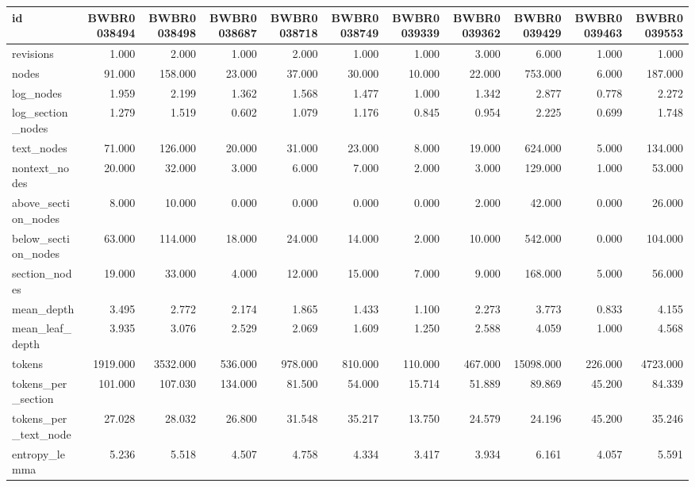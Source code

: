 \begin{tabular}{lrrrrrrrrrr}
\toprule
id & BWBR0038494 & BWBR0038498 & BWBR0038687 & BWBR0038718 & BWBR0038749 & BWBR0039339 & BWBR0039362 & BWBR0039429 & BWBR0039463 & BWBR0039553 \\
\midrule
revisions & 1.000 & 2.000 & 1.000 & 2.000 & 1.000 & 1.000 & 3.000 & 6.000 & 1.000 & 1.000 \\
\cline{1-11}
nodes & 91.000 & 158.000 & 23.000 & 37.000 & 30.000 & 10.000 & 22.000 & 753.000 & 6.000 & 187.000 \\
\cline{1-11}
log\_nodes & 1.959 & 2.199 & 1.362 & 1.568 & 1.477 & 1.000 & 1.342 & 2.877 & 0.778 & 2.272 \\
\cline{1-11}
log\_section\_nodes & 1.279 & 1.519 & 0.602 & 1.079 & 1.176 & 0.845 & 0.954 & 2.225 & 0.699 & 1.748 \\
\cline{1-11}
text\_nodes & 71.000 & 126.000 & 20.000 & 31.000 & 23.000 & 8.000 & 19.000 & 624.000 & 5.000 & 134.000 \\
\cline{1-11}
nontext\_nodes & 20.000 & 32.000 & 3.000 & 6.000 & 7.000 & 2.000 & 3.000 & 129.000 & 1.000 & 53.000 \\
\cline{1-11}
above\_section\_nodes & 8.000 & 10.000 & 0.000 & 0.000 & 0.000 & 0.000 & 2.000 & 42.000 & 0.000 & 26.000 \\
\cline{1-11}
below\_section\_nodes & 63.000 & 114.000 & 18.000 & 24.000 & 14.000 & 2.000 & 10.000 & 542.000 & 0.000 & 104.000 \\
\cline{1-11}
section\_nodes & 19.000 & 33.000 & 4.000 & 12.000 & 15.000 & 7.000 & 9.000 & 168.000 & 5.000 & 56.000 \\
\cline{1-11}
mean\_depth & 3.495 & 2.772 & 2.174 & 1.865 & 1.433 & 1.100 & 2.273 & 3.773 & 0.833 & 4.155 \\
\cline{1-11}
mean\_leaf\_depth & 3.935 & 3.076 & 2.529 & 2.069 & 1.609 & 1.250 & 2.588 & 4.059 & 1.000 & 4.568 \\
\cline{1-11}
tokens & 1919.000 & 3532.000 & 536.000 & 978.000 & 810.000 & 110.000 & 467.000 & 15098.000 & 226.000 & 4723.000 \\
\cline{1-11}
tokens\_per\_section & 101.000 & 107.030 & 134.000 & 81.500 & 54.000 & 15.714 & 51.889 & 89.869 & 45.200 & 84.339 \\
\cline{1-11}
tokens\_per\_text\_node & 27.028 & 28.032 & 26.800 & 31.548 & 35.217 & 13.750 & 24.579 & 24.196 & 45.200 & 35.246 \\
\cline{1-11}
entropy\_lemma & 5.236 & 5.518 & 4.507 & 4.758 & 4.334 & 3.417 & 3.934 & 6.161 & 4.057 & 5.591 \\

\end{tabular}
